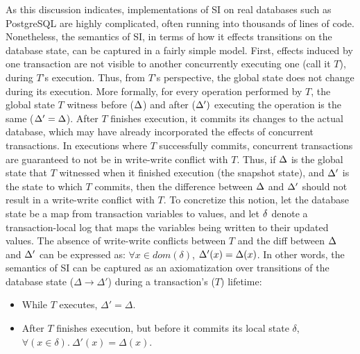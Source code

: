 As this discussion indicates, implementations of SI on real databases
such as PostgreSQL are highly complicated, often running into
thousands of lines of code.  Nonetheless, the semantics of SI, in
terms of how it effects transitions on the database state, can be
captured in a fairly simple model. First, effects induced by one
transaction are not visible to another concurrently executing one
(call it $T$), during $T$'s execution. Thus, from $T$'s perspective,
the global state does not change during its execution.  More formally,
for every operation performed by $T$, the global state $T$ witness
before ($\Delta$) and after ($\Delta')$ executing the operation is the
same ($\Delta'=\Delta$).  After $T$ finishes execution, it commits its
changes to the actual database, which may have already incorporated
the effects of concurrent transactions. In executions where $T$
successfully commits, concurrent transactions are guaranteed to not be
in write-write conflict with $T$. Thus, if $\Delta$ is the global state
that $T$ witnessed when it finished execution (the snapshot state),
and $\Delta'$ is the state to which $T$ commits, then the difference
between $\Delta$ and $\Delta'$ should not result in a write-write conflict
with $T$. To concretize this notion, let the database state be a map
from transaction variables to values, and let $\delta$ denote a
transaction-local log that maps the variables being written to their
updated values.  The absence of write-write conflicts between $T$ and
the diff between $\Delta$ and $\Delta'$ can be expressed as: $\forall
x\in\mathit{dom}(\delta)$, $\Delta'(x) = \Delta(x)$.  In other words, the
semantics of SI can be captured as an axiomatization over transitions
of the database state ($\Delta \longrightarrow \Delta'$) during a
transaction's ($T$) lifetime:
\begin{itemize}
  \item While $T$ executes, $\Delta' = \Delta$.
  \item After $T$ finishes execution, but before it commits its local
    state $\delta$, $\forall(x\in\delta).~\Delta'(x) = \Delta(x)$.
\end{itemize}

